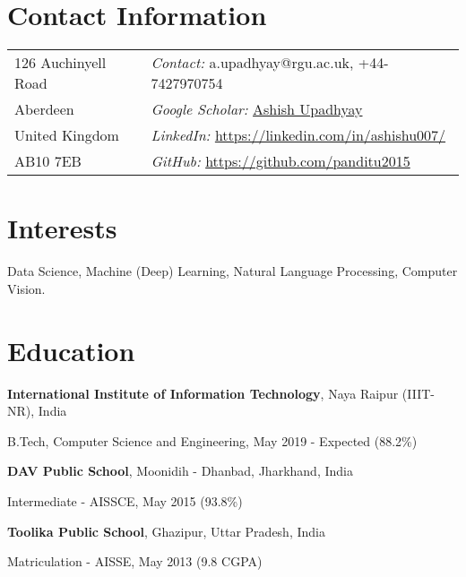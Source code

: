 \documentclass[margin,line]{res}
\newenvironment{list1}{
  \begin{list}{\ding{113}}{%
      \setlength{\itemsep}{0in}
      \setlength{\parsep}{0in} \setlength{\parskip}{0in}
      \setlength{\topsep}{0in} \setlength{\partopsep}{0in} 
      \setlength{\leftmargin}{0.17in}}}{\end{list}}
\begin{document}

\begin{resume}
\vspace{-0.1in}
\section{\sc Contact Information}
\begin{tabular}{@{}p{2in}p{3in}}          
126 Auchinyell Road   & {\it Contact:} a.upadhyay@rgu.ac.uk, +44-7427970754 \\         
Aberdeen & {\it Google Scholar:} {\href{https://scholar.google.co.in/citations?view_op=list_works&hl=en&user=aUwP8DAAAAAJ}{Ashish Upadhyay}}\\       
United Kingdom & {\it LinkedIn:} {\href{https://www.linkedin.com/in/ashishu007/}{https://linkedin.com/in/ashishu007/}} \\     
AB10 7EB  & {\it GitHub: }\href{https://github.com/panditu2015}{https://github.com/panditu2015} \\     
\end{tabular}

\vspace{-0.1in}
\section{\sc Interests}
Data Science, Machine (Deep) Learning, Natural Language Processing, Computer Vision.

\vspace{-0.1in}
\section{\sc Education}
{\bf International Institute of Information Technology}, Naya Raipur (IIIT-NR), India
\begin{list1}
\item[] B.Tech, Computer Science and Engineering, May 2019 - Expected (88.2\%)
\end{list1}
\vspace{-0.1in}
{\bf DAV Public School}, Moonidih - Dhanbad, Jharkhand, India\\
\vspace*{-.5cm}
\begin{list1}
\item[] Intermediate - AISSCE, May 2015 (93.8\%)
\end{list1}
\vspace{-0.1in}
{\bf Toolika Public School}, Ghazipur, Uttar Pradesh, India\\
\vspace*{-.5cm}
\begin{list1}
\item[] Matriculation - AISSE, May 2013 (9.8 CGPA)
\end{list1}


\end{resume}
\end{document}
